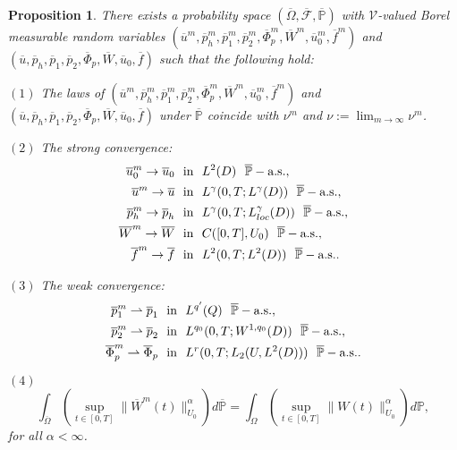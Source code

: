 \documentclass[reqno]{amsart}
\newtheorem{Proposition}{Proposition}[section]
\theoremstyle{definition}
\theoremstyle{remark}
\numberwithin{equation}{section} \allowdisplaybreaks
\begin{document}
\begin{Proposition}
There exists a probability space
$(\overline{\Omega},\overline{\mathscr{F}},\overline{\mathbb{P}})$
with $\mathcal{V}$-valued Borel measurable random variables
$(\overline{u}^m,\overline{p}_h^m,\overline{p}_1^m,\overline{p}_2^m,\overline{\Phi}_p^m,\overline{W}^m,\overline{u}^m_0,\overline{f}^m)$
and
$(\overline{u},\overline{p}_h,\overline{p}_1,\overline{p}_2,\overline{\Phi}_p,\overline{W},\overline{u}_0,\overline{f})$
such that the following hold:

$(1)$ The laws of
$(\overline{u}^m,\overline{p}_h^m,\overline{p}_1^m,\overline{p}_2^m,\overline{\Phi}_p^m,\overline{W}^m,\overline{u}^m_0,\overline{f}^m)$
and
$(\overline{u},\overline{p}_h,\overline{p}_1,\overline{p}_2,\overline{\Phi}_p,\overline{W},\overline{u}_0,\overline{f})$
under $\overline{\mathbb{P}}$ coincide with $\nu^m$ and
$\nu:=\lim_{m\rightarrow\infty}\nu^m$.

$(2)$ The strong convergence:
\begin{align*}
\overline{u}_0^m\rightarrow \overline{u}_0&~\mbox{ \rm in }~ L^{2}(D)\ \ \overline{\mathbb{P}}-\text{a.s.},\\
\overline{u}^m\rightarrow \overline{u}&~\mbox{ \rm in }~ L^{\gamma}(0,T;L^\gamma(D))\ \ \overline{\mathbb{P}}-\text{a.s.},\\
\overline{p}_h^m\rightarrow \overline{p}_h &~\mbox{ \rm in }~ L^{\gamma}(0,T;L^\gamma_{loc}(D))\ \ \overline{\mathbb{P}}-\text{a.s.},\\
\overline{W}^m\rightarrow \overline{W}& ~\mbox{ \rm in }~ C([0,T],{U}_0)\ \ \overline{\mathbb{P}}-\text{a.s.},\\
\overline{f}^m\rightarrow \overline{f}& ~\mbox{ \rm in }~
L^{2}(0,T;L^2(D))\ \ \overline{\mathbb{P}}-\text{a.s.}.
\end{align*}

$(3)$ The weak convergence:
\begin{align*}\overline{p}_1^m\rightharpoonup \overline{p}_1 &~\mbox{ \rm in }~ L^{q'}(Q)\ \ \overline{\mathbb{P}}-\text{a.s.},\\
\overline{p}_2^m\rightharpoonup \overline{p}_2 &~\mbox{ \rm in }~ L^{q_0}(0,T;W^{1,q_0}(D))\ \ \overline{\mathbb{P}}-\text{a.s.},\\
\overline{\Phi}_p^m\rightharpoonup \overline{\Phi}_p &~\mbox{ \rm in
}~ L^r(0,T;L_2({U},L^2(D)))\ \ \overline{\mathbb{P}}-\text{a.s.}.
\end{align*}

$(4)$
$$\int_{\overline{\Omega}}\left(\sup_{t\in[0,T]}\|\overline{W}^m(t)\|^{\alpha}_{{U}_0}\right)d\overline{\mathbb{P}}
=\int_{\Omega}\left(\sup_{t\in[0,T]}\|W(t)\|^{\alpha}_{{U}_0}\right)d\mathbb{P},$$
for all $\alpha<\infty$.
\end{Proposition}
\end{document}
